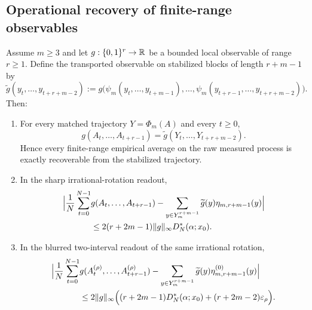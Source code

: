 \subsection{Operational recovery of finite-range observables}

\begin{theorem}\label{thm:operational-observable-recovery}
Assume $m\ge 3$ and let $g:\{0,1\}^r\to\mathbb{R}$ be a bounded local observable of range $r\ge 1$. Define the transported observable on stabilized blocks of length $r+m-1$ by
\[
\widetilde g(y_t,\dots,y_{t+r+m-2})
:=
g\bigl(\psi_m(y_t,\dots,y_{t+m-1}),\dots,\psi_m(y_{t+r-1},\dots,y_{t+r+m-2})\bigr).
\]
Then:
\begin{enumerate}[label=(\roman*),leftmargin=*,itemsep=2pt]
  \item For every matched trajectory $Y=\Phi_m(A)$ and every $t\ge 0$,
  \[
  g(A_t,\dots,A_{t+r-1})=\widetilde g(Y_t,\dots,Y_{t+r+m-2}).
  \]
  Hence every finite-range empirical average on the raw measured process is exactly recoverable from the stabilized trajectory.
  \item In the sharp irrational-rotation readout,
  \begin{equation*}
  \begin{aligned}
  \Bigl|
  \frac1N\sum_{t=0}^{N-1} &g(A_t,\dots,A_{t+r-1})
  -
  \sum_{y\in Y_m^{r+m-1}}\widetilde g(y)\eta_{m,r+m-1}(y)
  \Bigr|
  \\
  &\le
  2(r+2m-1)\|g\|_\infty D_N^*(\alpha;x_0).
  \end{aligned}
  \end{equation*}
  \item In the blurred two-interval readout of the same irrational rotation,
  \begin{equation*}
  \begin{aligned}
  \Bigl|
  \frac1N\sum_{t=0}^{N-1} &g(A_t^{(\rho)},\dots,A_{t+r-1}^{(\rho)})
  -
  \sum_{y\in Y_m^{r+m-1}}\widetilde g(y)\eta_{m,r+m-1}^{(0)}(y)
  \Bigr|
  \\
  &\le
  2\|g\|_\infty\Bigl((r+2m-1)D_N^*(\alpha;x_0)+(r+2m-2)\varepsilon_\rho\Bigr).
  \end{aligned}
  \end{equation*}
\end{enumerate}
\end{theorem}

